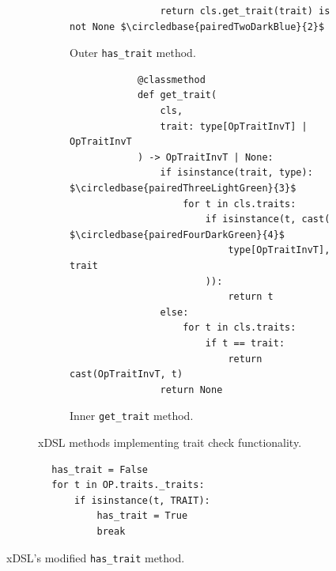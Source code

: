 \begin{figure}[H]
\begin{subfigure}[b]{0.45\textwidth}
\begin{verbatim}
                return cls.get_trait(trait) is not None $\circledbase{pairedTwoDarkBlue}{2}$
        \end{verbatim}
        \footnotesize\vspace{1.5em}
        \caption{Outer \texttt{has_trait} method.}
        \label{listing:ubenchmark-trait-checks-xdsl-has}
    \end{subfigure}
    \hfill
    \begin{subfigure}[b]{0.45\textwidth}
        \centering
        \begin{verbatim}
            @classmethod
            def get_trait(
                cls,
                trait: type[OpTraitInvT] | OpTraitInvT
            ) -> OpTraitInvT | None:
                if isinstance(trait, type): $\circledbase{pairedThreeLightGreen}{3}$
                    for t in cls.traits:
                        if isinstance(t, cast( $\circledbase{pairedFourDarkGreen}{4}$
                            type[OpTraitInvT], trait
                        )):
                            return t
                else:
                    for t in cls.traits:
                        if t == trait:
                            return cast(OpTraitInvT, t)
                return None
        \end{verbatim}
        \caption{Inner \texttt{get_trait} method.}
        \label{listing:ubenchmark-trait-checks-xdsl-get}
    \end{subfigure}
    \vspace{1em}
    \captionsetup{name=Listing}
    \caption{xDSL methods implementing trait check functionality.}
    \label{listing:ubenchmark-trait-checks-xdsl}
\end{figure}



\begin{code}
    \centering
    \begin{verbatim}
        has_trait = False
        for t in OP.traits._traits:
            if isinstance(t, TRAIT):
                has_trait = True
                break
    \end{verbatim}
    \footnotesize\vspace{5.5em}
    \captionsetup{name=Listing}
    \caption{xDSL's modified \texttt{has_trait} method.}
    \label{listing:ubenchmark-trait-checks-xdsl-optimised}
\end{code}

